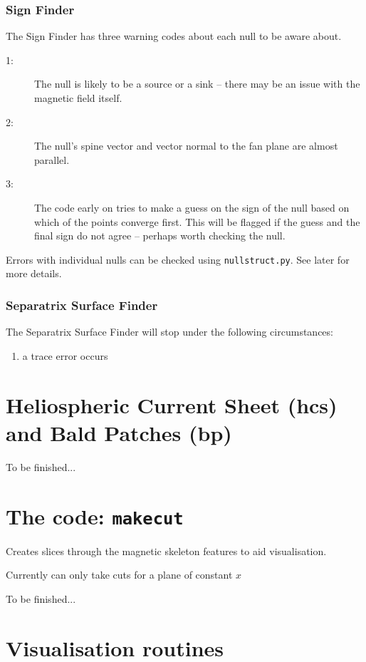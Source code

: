 \documentclass[12pt]{article}
\begin{document}
      \subsubsection{Sign Finder}
        The Sign Finder has three warning codes about each null to be aware about.
        \begin{description}
          \item [1:] The null is likely to be a source or a sink -- there may be an issue with the magnetic field itself.
          \item [2:] The null's spine vector and vector normal to the fan plane are almost parallel.
          \item [3:] The code early on tries to make a guess on the sign of the null based on which of the points converge first. This will be flagged if the guess and the final sign do not agree -- perhaps worth checking the null.
        \end{description}
        Errors with individual nulls can be checked using \texttt{nullstruct.py}. See later for more details.
      
      \subsubsection{Separatrix Surface Finder}
        The Separatrix Surface Finder will stop under the following circumstances:
        \begin{enumerate}
          \item a trace error occurs
        \end{enumerate}

  \section{Heliospheric Current Sheet (hcs) and Bald Patches (bp)}

    To be finished...

  \section{The code: \texttt{makecut}}

    Creates slices through the magnetic skeleton features to aid visualisation.

    Currently can only take cuts for a plane of constant \( x \)

    To be finished...

  \section{Visualisation routines}
    \label{sec:vis}
\end{document}
